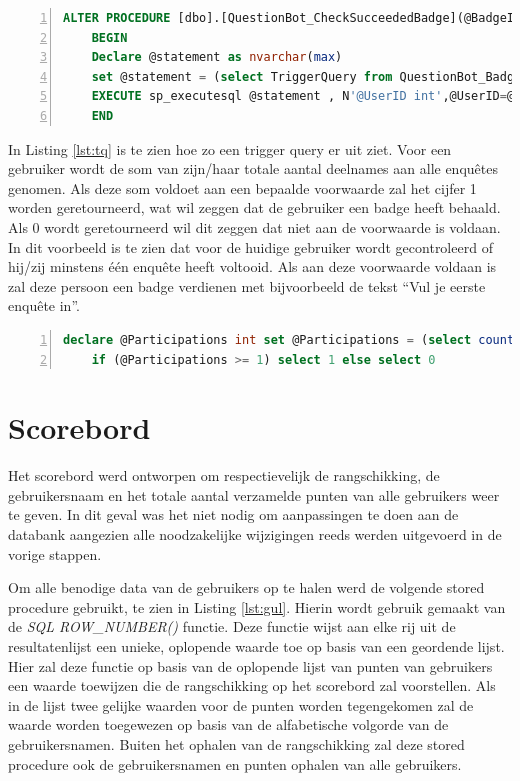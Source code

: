 \begin{lstlisting}[caption={De CheckSucceededBadge stored procedure.},
    label={lst:csb},
    language=SQL,
    showspaces=false,
    basicstyle=\ttfamily,
    numbers=left,
    numberstyle=\tiny,
    numbersep=1pt,
    breaklines=true
    commentstyle=\color{gray}]
    ALTER PROCEDURE [dbo].[QuestionBot_CheckSucceededBadge](@BadgeID int, @UserID int) as
    BEGIN
    Declare @statement as nvarchar(max) 
    set @statement = (select TriggerQuery from QuestionBot_Badge where ID = @BadgeID) 
    EXECUTE sp_executesql @statement , N'@UserID int',@UserID=@UserID
    END
\end{lstlisting}

In Listing \ref{lst:tq} is te zien hoe zo een trigger query er uit ziet. Voor een gebruiker wordt de som van zijn/haar totale aantal deelnames aan alle enquêtes genomen. Als deze som voldoet aan een bepaalde voorwaarde zal het cijfer 1 worden geretourneerd, wat wil zeggen dat de gebruiker een badge heeft behaald. Als 0 wordt geretourneerd wil dit zeggen dat niet aan de voorwaarde is voldaan. In dit voorbeeld is te zien dat voor de huidige gebruiker wordt gecontroleerd of hij/zij minstens één enquête heeft voltooid. Als aan deze voorwaarde voldaan is zal deze persoon een badge verdienen met bijvoorbeeld de tekst ``Vul je eerste enquête in''.

\begin{lstlisting}[caption={De badge trigger query.},
    label={lst:tq},
    language=SQL,
    showspaces=false,
    basicstyle=\ttfamily,
    numbers=left,
    numberstyle=\tiny,
    numbersep=1pt,
    breaklines=true
    commentstyle=\color{gray}]
    declare @Participations int set @Participations = (select count(*) from QuestionBot_Participations where UserID = @UserID) 
    if (@Participations >= 1) select 1 else select 0
\end{lstlisting}

\section{Scorebord}

Het scorebord werd ontworpen om respectievelijk de rangschikking, de gebruikersnaam en het totale aantal verzamelde punten van alle gebruikers weer te geven. In dit geval was het niet nodig om aanpassingen te doen aan de databank aangezien alle noodzakelijke wijzigingen reeds werden uitgevoerd in de vorige stappen.

Om alle benodige data van de gebruikers op te halen werd de volgende stored procedure gebruikt, te zien in Listing \ref{lst:gul}. Hierin wordt gebruik gemaakt van de \textit{SQL ROW\_NUMBER()} functie. Deze functie wijst aan elke rij uit de resultatenlijst een unieke, oplopende waarde toe op basis van een geordende lijst. Hier zal deze functie op basis van de oplopende lijst van punten van gebruikers een waarde toewijzen die de rangschikking op het scorebord zal voorstellen. Als in de lijst twee gelijke waarden voor de punten worden tegengekomen zal de waarde worden toegewezen op basis van de alfabetische volgorde van de gebruikersnamen. Buiten het ophalen van de rangschikking zal deze stored procedure ook de gebruikersnamen en punten ophalen van alle gebruikers.

